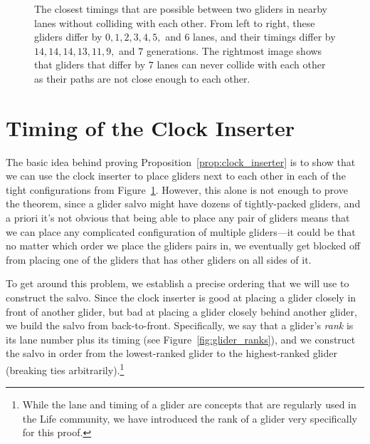 \begin{figure}[!ht]
	\centering{}
	\caption{The closest timings that are possible between two gliders in nearby lanes without colliding with each other. From left to right, these gliders differ by $0, 1, 2, 3, 4, 5,$ and $6$ lanes, and their timings differ by $14, 14, 14, 13, 11, 9,$ and $7$ generations. The rightmost image shows that gliders that differ by $7$ lanes can never collide with each other as their paths are not close enough to each other.}\label{fig:tight_glider_packings}
\end{figure}


\section{Timing of the Clock Inserter}\label{sec:clock_inserter_timing}

The basic idea behind proving Proposition~\ref{prop:clock_inserter} is to show that we can use the clock inserter to place gliders next to each other in each of the tight configurations from Figure~\ref{fig:tight_glider_packings}. However, this alone is not enough to prove the theorem, since a glider salvo might have dozens of tightly-packed gliders, and a priori it's not obvious that being able to place any pair of gliders means that we can place any complicated configuration of multiple gliders---it could be that no matter which order we place the gliders pairs in, we eventually get blocked off from placing one of the gliders that has other gliders on all sides of it.

To get around this problem, we establish a precise ordering that we will use to construct the salvo. Since the clock inserter is good at placing a glider closely in front of another glider, but bad at placing a glider closely behind another glider, we build the salvo from back-to-front. Specifically, we say that a glider's \emph{rank} is its lane number plus its timing (see Figure~\ref{fig:glider_ranks}), and we construct the salvo in order from the lowest-ranked glider to the highest-ranked glider (breaking ties arbitrarily).\footnote{While the lane and timing of a glider are concepts that are regularly used in the Life community, we have introduced the rank of a glider very specifically for this proof.}

